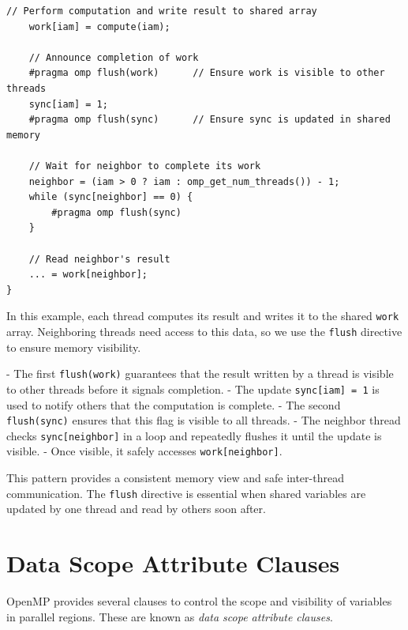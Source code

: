 \documentclass[12pt]{book}
\begin{document}
\begin{itemize}
\begin{lstlisting}[style=cppstyle, caption={Flush Directive}, captionpos=b, label={lst:flush}]
    // Perform computation and write result to shared array
    work[iam] = compute(iam);

    // Announce completion of work
    #pragma omp flush(work)      // Ensure work is visible to other threads
    sync[iam] = 1;
    #pragma omp flush(sync)      // Ensure sync is updated in shared memory

    // Wait for neighbor to complete its work
    neighbor = (iam > 0 ? iam : omp_get_num_threads()) - 1;
    while (sync[neighbor] == 0) {
        #pragma omp flush(sync)
    }

    // Read neighbor's result
    ... = work[neighbor];
}
\end{lstlisting}

In this example, each thread computes its result and writes it to the shared \texttt{work} array. Neighboring threads need access to this data, so we use the \texttt{flush} directive to ensure memory visibility.

- The first \texttt{flush(work)} guarantees that the result written by a thread is visible to other threads before it signals completion.
- The update \texttt{sync[iam] = 1} is used to notify others that the computation is complete.
- The second \texttt{flush(sync)} ensures that this flag is visible to all threads.
- The neighbor thread checks \texttt{sync[neighbor]} in a loop and repeatedly flushes it until the update is visible.
- Once visible, it safely accesses \texttt{work[neighbor]}.

This pattern provides a consistent memory view and safe inter-thread communication. The \texttt{flush} directive is essential when shared variables are updated by one thread and read by others soon after.

\end{itemize}


\section{Data Scope Attribute Clauses}

OpenMP provides several clauses to control the scope and visibility of variables in parallel regions. These are known as \textit{data scope attribute clauses}.
\end{document}
